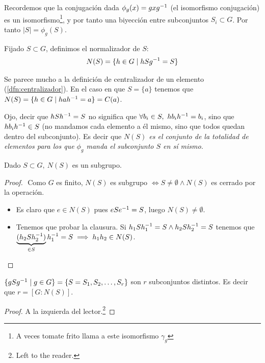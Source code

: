 Recordemos que la conjugación dada $\phi_g(x) = gxg^{-1}$ (el isomorfismo conjugación) es un isomorfismo\footnote{A veces tomate frito llama a este isomorfismo $\gamma_g$}, y por tanto una biyección entre subconjuntos $S_i \subset G$. Por tanto $|S| = \phi_g(S)$.

\begin{dfn}
	\label{dfn:normalizador}
	Fijado $S \subset G$, definimos el normalizador de $S$:
	\begin{align}
	N(S) = \{h \in G \mid hSg^{-1} = S\}
	\end{align} 
\end{dfn}

Se parece mucho a la definición de centralizador de un elemento (\ref{dfn:centralizador}). En el caso en que $S = \{a\}$ tenemos que $N(S) = \{h \in G \mid hah^{-1} = a\} = C(a)$.

Ojo, decir que $hSh^{-1} = S$ no significa que $\forall b_i \in S,\ hb_ih^{-1} = b_i$, sino que $hb_ih^{-1} \in S$ (no mandamos cada elemento a él mismo, sino que todos quedan dentro del subconjunto). Es decir que \textit{$N(S)$ es el conjunto de la totalidad de elementos para los que $\phi_g$ manda el subconjunto $S$ en sí mismo.}

\begin{pro}
	Dado $S \subset G,\ N(S)$ es un subgrupo.
\end{pro}

\begin{proof}$ $\newline
	Como $G$ es finito, $N(S)$ es subgrupo $\iff S \neq \emptyset \land N(S)$ es cerrado por la operación.
	\begin{itemize}
		\item Es claro que $e \in N(S)$ pues $eSe^{-1} = S$, luego $N(S) \neq \emptyset$.
		\item Tenemos que probar la clausura. Si $h_1Sh_1^{-1} = S \land h_2Sh_2^{-1} = S$ tenemos que $\underbrace{(h_2Sh_2^{-1})}_{\in S}h_1^{-1} = S \implies h_1h_2 \in N(S)$.
	\end{itemize}
\end{proof}

\begin{pro}
	\label{pro:propiedad2Ns}
	$\{gSg^{-1} \mid g \in G\} = \{S = S_1, S_2, \dots, S_r\}$ son $r$ subconjuntos distintos. Es decir que $r = [G: N(S)]$.
\end{pro}

\begin{proof}
	A la izquierda del lector.\footnote{Left to the reader.}
\end{proof}

